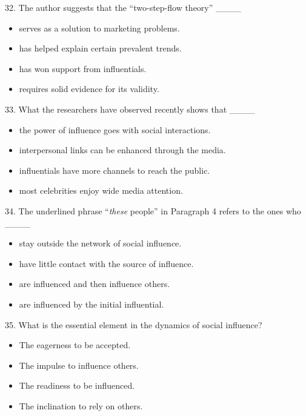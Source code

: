 \documentclass[UTF8,11pt]{ctexart}
\begin{document}
32. The author suggests that the “two-step-flow theory” \_\_\_\_


\begin{itemize}[leftmargin=2em,itemsep=.2em,topsep=.4em]\item[A.] serves as a solution to marketing problems.
\item[B.] has helped explain certain prevalent trends.
\item[C.] has won support from influentials.
\item[D.] requires solid evidence for its validity.
\end{itemize}

33. What the researchers have observed recently shows that \_\_\_\_


\begin{itemize}[leftmargin=2em,itemsep=.2em,topsep=.4em]\item[A.] the power of influence goes with social interactions.
\item[B.] interpersonal links can be enhanced through the media.
\item[C.] influentials have more channels to reach the public.
\item[D.] most celebrities enjoy wide media attention.
\end{itemize}

34. The underlined phrase “\textit{these} people” in Paragraph 4 refers to the ones who \_\_\_\_


\begin{itemize}[leftmargin=2em,itemsep=.2em,topsep=.4em]\item[A.] stay outside the network of social influence.
\item[B.] have little contact with the source of influence.
\item[C.] are influenced and then influence others.
\item[D.] are influenced by the initial influential.
\end{itemize}

35. What is the essential element in the dynamics of social influence?


\begin{itemize}[leftmargin=2em,itemsep=.2em,topsep=.4em]\item[A.] The eagerness to be accepted.
\item[B.] The impulse to influence others.
\item[C.] The readiness to be influenced.
\item[D.] The inclination to rely on others.
\end{itemize}
\end{document}
